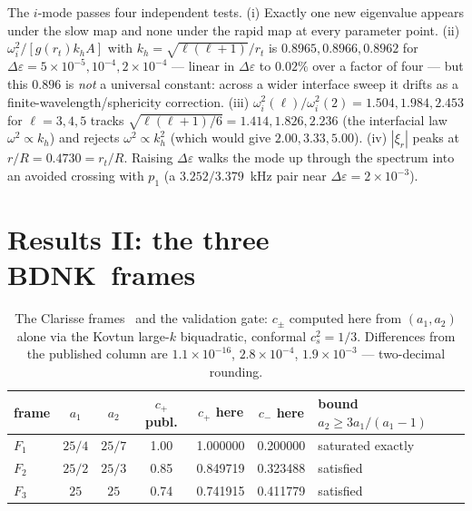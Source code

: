 \documentclass[aps,prd,preprint,amsmath,amssymb,nofootinbib,longbibliography]{revtex4-2}
\newcommand{\cs}{c_s}
\newcommand{\BDNK}{BDNK}
\begin{document}
The $i$-mode passes four independent tests. (i) Exactly one new eigenvalue appears under the
slow map and none under the rapid map at every parameter point. (ii) $\omega_i^2/[g(r_t)k_hA]$
with $k_h = \sqrt{\ell(\ell+1)}/r_t$ is $0.8965, 0.8966, 0.8962$ for
$\Delta\varepsilon = 5\times10^{-5}, 10^{-4}, 2\times10^{-4}$ --- linear in $\Delta\varepsilon$
to $0.02\%$ over a factor of four --- but this $0.896$ is \emph{not} a universal constant: across
a wider interface sweep it drifts as a finite-wavelength/sphericity correction. (iii)
$\omega_i^2(\ell)/\omega_i^2(2) = 1.504, 1.984, 2.453$ for $\ell = 3,4,5$ tracks
$\sqrt{\ell(\ell+1)/6} = 1.414, 1.826, 2.236$ (the interfacial law $\omega^2\propto k_h$) and
rejects $\omega^2\propto k_h^2$ (which would give $2.00, 3.33, 5.00$). (iv) $|\xi_r|$ peaks at
$r/R = 0.4730 = r_t/R$. Raising $\Delta\varepsilon$ walks the mode up through the spectrum into
an avoided crossing with $p_1$ (a $3.252/3.379$~kHz pair near $\Delta\varepsilon = 2\times10^{-3}$).

\section{Results II: the three \BDNK\ frames}
\label{sec:frames}

\begin{table}[htbp]
\caption{The Clarisse frames~\cite{Clarisse2025} and the validation gate: $c_\pm$ computed here
from $(a_1,a_2)$ alone via the Kovtun large-$k$ biquadratic, conformal $\cs^2=1/3$. Differences
from the published column are $1.1\times10^{-16}$, $2.8\times10^{-4}$, $1.9\times10^{-3}$ ---
two-decimal rounding.}
\label{tab:frames}
\begin{ruledtabular}
\begin{tabular}{lcccccl}
frame & $a_1$ & $a_2$ & $c_+$ publ. & $c_+$ here & $c_-$ here & bound $a_2\ge3a_1/(a_1-1)$\\
\hline
$F_1$ & $25/4$ & $25/7$ & 1.00 & 1.000000 & 0.200000 & saturated exactly\\
$F_2$ & $25/2$ & $25/3$ & 0.85 & 0.849719 & 0.323488 & satisfied\\
$F_3$ & $25$   & $25$   & 0.74 & 0.741915 & 0.411779 & satisfied\\
\end{tabular}
\end{ruledtabular}
\end{table}
\end{document}

